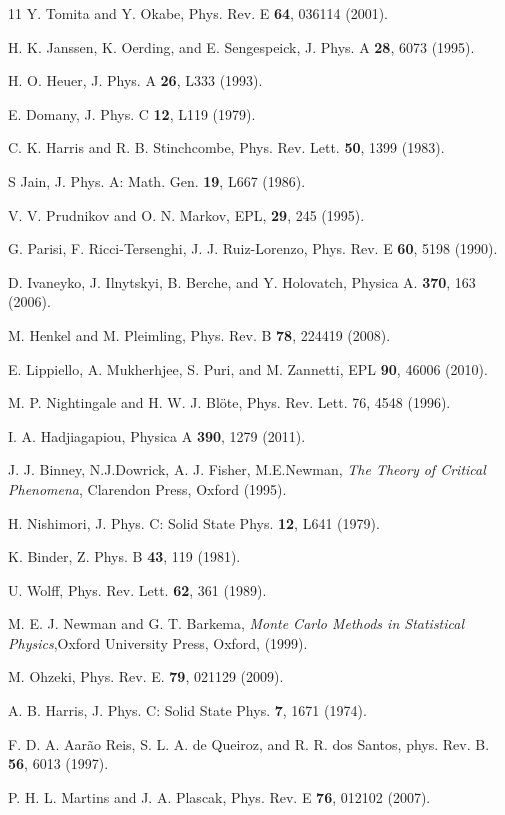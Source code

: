\documentclass[12pt,nofootinbib,aps,amsmath,amssymb,preprint,showpacs]{revtex4}
\begin{document}
\begin{thebibliography}{11}
 Y. Tomita and Y. Okabe, Phys. Rev. E {\bf 64}, 036114
  (2001).

 H. K. Janssen, K. Oerding, and E. Sengespeick,
  J. Phys. A {\bf 28}, 6073 (1995).

 H. O. Heuer, J. Phys. A {\bf 26}, L333 (1993).

 E. Domany, J. Phys. C {\bf 12}, L119 (1979).
 
 C. K. Harris and R. B. Stinchcombe, Phys. Rev. Lett. {\bf 50}, 1399 (1983). 

 S Jain, J. Phys. A: Math. Gen. {\bf 19}, L667 (1986).

 V. V. Prudnikov and O. N. Markov, EPL, {\bf 29}, 245 (1995).

 G. Parisi, F. Ricci-Tersenghi, J. J. Ruiz-Lorenzo, Phys. Rev. E {\bf 60}, 5198 (1990).

 D. Ivaneyko, J. Ilnytskyi, B. Berche, and Y. Holovatch, Physica A. {\bf 370}, 163 (2006).

 M. Henkel and M. Pleimling, Phys. Rev. B {\bf 78}, 224419 (2008).

 E. Lippiello, A. Mukherhjee, S. Puri, and M. Zannetti, EPL {\bf 90}, 46006 (2010).

 M. P. Nightingale and H. W. J. Bl\"{o}te,
  Phys. Rev. Lett. 76, 4548 (1996).

 I. A. Hadjiagapiou, Physica A {\bf 390}, 1279 (2011).

 J. J. Binney, N.J.Dowrick, A. J. Fisher, M.E.Newman,
  {\it The Theory of Critical Phenomena}, Clarendon Press, Oxford
  (1995).

 H. Nishimori, J. Phys. C: Solid State Phys. {\bf 12},
  L641 (1979).

 K. Binder, Z. Phys. B {\bf 43}, 119 (1981).

 U. Wolff, Phys. Rev. Lett. {\bf 62}, 361 (1989).

 M. E. J. Newman and G. T. Barkema, {\it Monte Carlo
  Methods in Statistical Physics},Oxford University Press, Oxford,
  (1999).

 M. Ohzeki, Phys. Rev. E. {\bf 79}, 021129 (2009).


 A. B. Harris, J. Phys. C: Solid State Phys. {\bf 7}, 1671 (1974).

 F. D. A. Aar\~{a}o Reis, S. L. A. de Queiroz, and R. R. dos Santos, phys. Rev. B. {\bf 56}, 6013 (1997).

 P. H. L. Martins and J. A. Plascak, Phys. Rev. E {\bf 76}, 012102 (2007).
\end{thebibliography}
\end{document}

